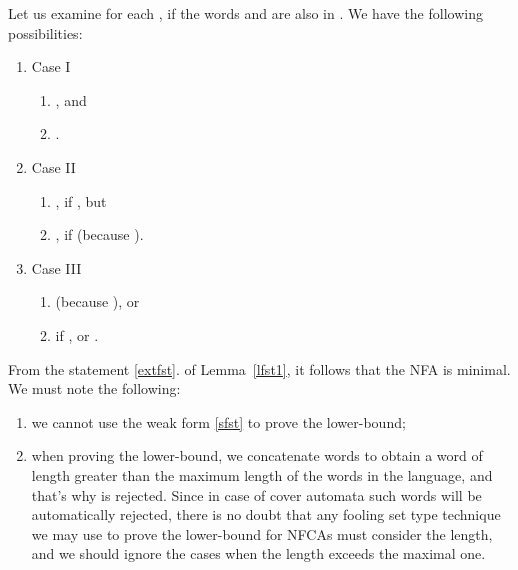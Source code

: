 \documentclass[submission,copyright,creativecommons]{eptcs}
\begin{document}
Let us examine for each ,  if  the words  
 and 
 are also in . We have the following possibilities:
\begin{enumerate}
  \item Case I
  \begin{enumerate}
   \item , and
   \item .
  \end{enumerate}
 \item Case II
  \begin{enumerate}
   \item , if , but 
   \item , if  (because ).
  \end{enumerate}
 \item Case III
  \begin{enumerate}
   \item  (because ), or
   \item  if , 
         or 
          .
  \end{enumerate}
\end{enumerate}
From the statement \ref{extfst}. of Lemma~\ref{lfst1}, it follows that the NFA is minimal. 
We must note the following:
\begin{enumerate}
 \item we cannot use the weak form \ref{sfst} to prove the lower-bound;
 \item when proving the lower-bound, we concatenate words to obtain a word 
of length greater than the maximum length of the words in the language, and 
that's why  is rejected.
Since in case of cover automata such words will be automatically rejected, there is no doubt that any fooling set type 
technique we may use to prove the lower-bound for NFCAs must consider the length, and 
we should ignore the cases when the length exceeds the maximal one.
\end{enumerate}
\end{document}

